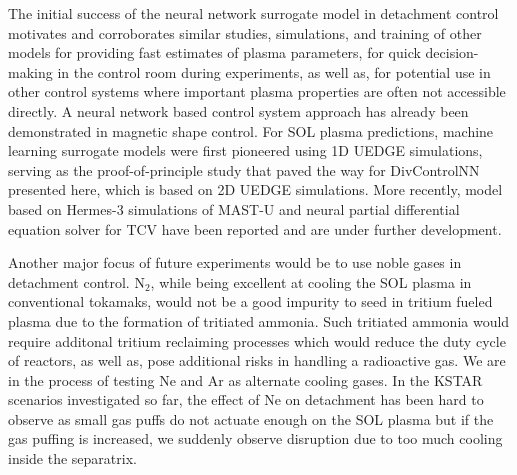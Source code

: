 The initial success of the neural network surrogate model in detachment control motivates and corroborates similar studies, simulations, and training of other models for providing fast estimates of plasma parameters, for quick decision-making in the control room during experiments, as well as, for potential use in other control systems where important plasma properties are often not accessible directly.
A neural network based control system approach has already been demonstrated in magnetic shape control\cite{Degrave_2022_Nature}.
For \ac{SOL} plasma predictions, machine learning surrogate models were first pioneered using 1D UEDGE simulations\cite{Zhu_2022_JPP}, serving as the proof-of-principle study that paved the way for DivControlNN presented here, which is based on 2D UEDGE simulations.
More recently, model based on Hermes-3\cite{Dudson_2024_CPC} simulations of MAST-U\cite{Holt_2024_NF} and neural partial differential equation solver for TCV\cite{Poels_2023_NF} have been reported and are under further development.

Another major focus of future experiments would be to use noble gases in detachment control.
N$_2$, while being excellent at cooling the SOL plasma in conventional tokamaks, would not be a good impurity to seed in tritium fueled plasma due to the formation of tritiated ammonia\cite{Pitts_2019_NME}.
Such tritiated ammonia would require additonal tritium reclaiming processes which would reduce the duty cycle of reactors, as well as, pose additional risks in handling a radioactive gas.
We are in the process of testing Ne and Ar as alternate cooling gases.
In the KSTAR scenarios investigated so far, the effect of Ne on detachment has been hard to observe as small gas puffs do not actuate enough on the \ac{SOL} plasma but if the gas puffing is increased, we suddenly observe disruption due to too much cooling inside the separatrix.
